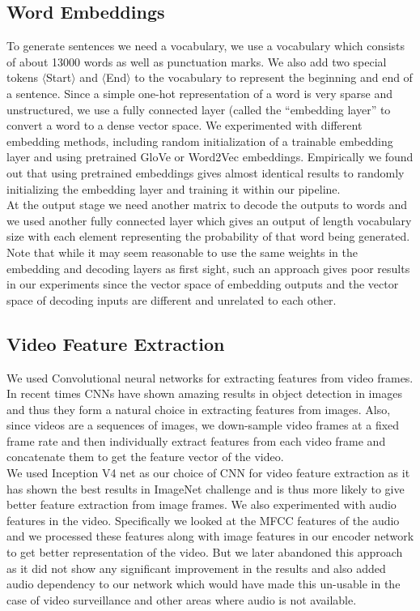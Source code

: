 \documentclass[12pt]{article}
\begin{document}
\subsection{Word Embeddings}
To generate sentences we need a vocabulary, we use a vocabulary which consists of about 13000 words as well as punctuation marks. We also add two special tokens $\langle$Start$\rangle$ and $\langle$End$\rangle$ to the vocabulary to represent the beginning and end of a sentence. Since a simple one-hot representation of a word is very sparse and unstructured, we use a fully connected layer (called the ``embedding layer'' to convert a word to a dense vector space. We experimented with different embedding methods, including random initialization of a trainable embedding layer and using pretrained GloVe or Word2Vec embeddings. Empirically we found out that using pretrained embeddings gives almost identical results to randomly initializing the embedding layer and training it within our pipeline.\\
At the output stage we need another matrix to decode the outputs to words and we used another fully connected layer which gives an output of length vocabulary size with each element representing the probability of that word being generated. Note that while it may seem reasonable to use the same weights in the embedding and decoding layers as first sight, such an approach gives poor results in our experiments since the vector space of embedding outputs and the vector space of decoding inputs are different and unrelated to each other.

\subsection{Video Feature Extraction}

	We used Convolutional neural networks for extracting features from video frames. In recent times CNNs have shown amazing results in object
	detection in images and thus they form a natural choice in extracting features from images. Also, since videos are a sequences of images, we
	down-sample video frames at a fixed frame rate and then individually extract features from each video frame and concatenate them to get 
	the feature vector of the video.\\
	We used Inception V4 net as our choice of CNN for video feature extraction as it has shown the best results in ImageNet challenge and is thus
	more likely to give better feature extraction from image frames. We also experimented with audio features in the video. Specifically we looked
	at the MFCC features of the audio and we processed these features along with image features in our encoder network to get better representation
	of the video. But we later abandoned this approach as it did not show any significant improvement in the results and also added audio dependency
	to our network which would have made this un-usable in the case of video surveillance and other areas where audio is not available.
	
\end{document}
